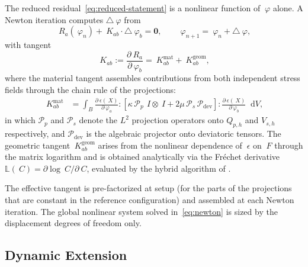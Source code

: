 \documentclass[12pt]{article}
\newcommand{\F}{~F}
\newcommand{\C}{~C}
\newcommand{\eps}{~\epsilon}
\DeclareMathOperator{\dev}{dev}
\newcommand*\diff{\mathop{}\!\mathrm{d}}
\begin{document}
The reduced residual~\eqref{eq:reduced-statement} is a nonlinear
function of $~\varphi$ alone. A Newton iteration computes
$\triangle ~\varphi$ from
\begin{equation}
  \label{eq:newton}
  ~R_a(~\varphi_n) + ~K_{ab} \cdot \triangle ~\varphi_b = \mathbf{0},
  \qquad
  ~\varphi_{n+1} = ~\varphi_n + \triangle ~\varphi,
\end{equation}
with tangent
\begin{equation}
  \label{eq:tangent}
  ~K_{ab}
  :=
  \frac{\partial ~R_a}{\partial ~\varphi_b}
  =
  ~K^{\mathrm{mat}}_{ab}
  +
  ~K^{\mathrm{geom}}_{ab},
\end{equation}
where the material tangent assembles contributions from both
independent stress fields through the chain rule of the projections:
\begin{equation}
  \label{eq:material-tangent}
  \begin{split}
    ~K^{\mathrm{mat}}_{ab}
    & =
    \int_B
    \frac{\partial \eps(~X)}{\partial ~\varphi_a}
    :
    \left[
      \kappa\, \mathcal{P}_{p} \, ~I \otimes ~I
      +
      2\mu \, \mathcal{P}_{s} \, \mathcal{P}_{\dev}
    \right]
    :
    \frac{\partial \eps(~X)}{\partial ~\varphi_b}
    \diff V,
  \end{split}
\end{equation}
in which $\mathcal{P}_p$ and $\mathcal{P}_s$ denote the $L^2$
projection operators onto $Q_{p,h}$ and $V_{s,h}$ respectively, and
$\mathcal{P}_{\dev}$ is the algebraic projector onto deviatoric
tensors. The geometric tangent $~K^{\mathrm{geom}}_{ab}$ arises from
the nonlinear dependence of $\eps$ on $\F$ through the matrix
logarithm and is obtained analytically via the Fr\'echet derivative
$\mathbb{L}(\C) = \partial \log\C / \partial \C$, evaluated by the
hybrid algorithm of \citet{Ortiz.Radovitzky.Repetto:2001}.

The effective tangent is pre-factorized at setup (for the parts of
the projections that are constant in the reference configuration)
and assembled at each Newton iteration. The global nonlinear system
solved in~\eqref{eq:newton} is sized by the displacement degrees of
freedom only.

\subsection{Dynamic Extension}
\label{sec:dynamics}
\end{document}
